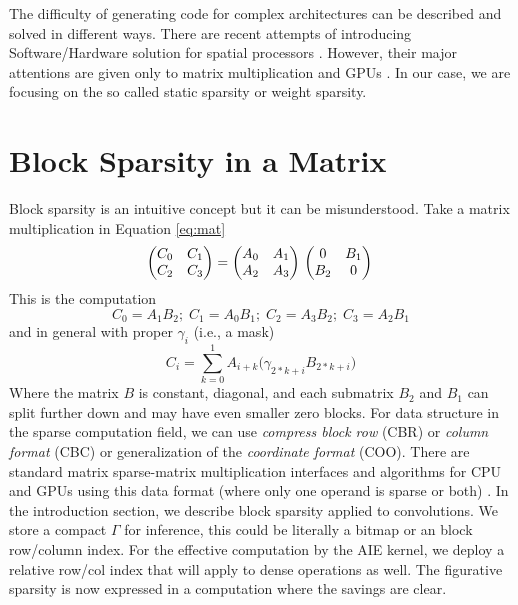 \documentclass[conference]{IEEEtran}
\begin{document}
The difficulty of generating code for complex architectures can be
described and solved in different ways. There are recent attempts of
introducing Software/Hardware solution for spatial processors
\cite{Huang2021CoSASB,Russo2023MemoryAwareDA,Cai2023InterlayerSS}.
However, their major attentions are given only to matrix
multiplication and GPUs \cite{Gray2017GPUKF}
\cite{li2023popsparse}. In our case, we are focusing on the so called
static sparsity or weight sparsity.


\section{Block Sparsity in a Matrix}

Block sparsity is an intuitive concept but it can be
misunderstood. Take a matrix multiplication in Equation \ref{eq:mat}
\begin{equation}
  \label{eq:mat}
  \begin{pmatrix}
    C_{0} & C_{1} \\
    C_{2} & C_{3}  
  \end{pmatrix} = 
  \begin{pmatrix}
    A_{0} & A_{1} \\
    A_{2} & A_{3} \\ 
  \end{pmatrix}\\  \begin{pmatrix}
    0   & B_{1} \\
    B_{2} & 0 \\ 
  \end{pmatrix}\\
\end{equation}
This is the computation 
{\small \begin{equation} 
    C_{0} = A_{1}B_{2}; \; 
    C_{1} = A_{0} B_{1}; \; 
    C_{2} = A_{3} B_{2}; \; 
    C_{3} = A_{2} B_{1}
\end{equation}}
and in general with proper $\gamma_i$ (i.e., a mask)
\begin{equation}
  C_{i} = \sum_{k=0}^1 A_{i+ k} \big(\gamma_{2*k+i} B_{2*k+i}\big)
\end{equation}
Where the matrix $B$ is constant, diagonal, and each submatrix $B_{2}$
and $B_{1}$ can split further down and may have even smaller zero
blocks. For data structure in the sparse computation field, we can use
{\em compress block row} (CBR) or {\em column format} (CBC) or
generalization of the {\em coordinate format} (COO). There are
standard matrix sparse-matrix multiplication interfaces and algorithms
for CPU and GPUs using this data format (where only one operand is
sparse or both) \cite{rocSPARSE,cuSPARSE}. In the introduction
section, we describe block sparsity applied to convolutions. We store
a compact $\Gamma$ for inference, this could be literally a bitmap or
an block row/column index. For the effective computation by the AIE
kernel, we deploy a relative row/col index that will apply to dense
operations as well. The figurative sparsity is now expressed in a
computation where the savings are clear.
\end{document}
